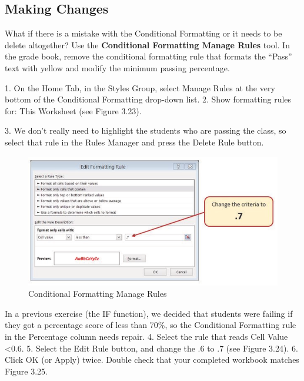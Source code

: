 \subsection{Making Changes}
What if there is a mistake with the Conditional Formatting or it needs to be delete altogether? Use the \textbf{Conditional Formatting Manage Rules} tool. In the grade book, remove the conditional formatting rule that formats the ``Pass'' text with yellow and modify the minimum passing percentage.

1. On the Home Tab, in the Styles Group, select Manage Rules at the very bottom of the
Conditional Formatting drop-down list.
2. Show formatting rules for: This Worksheet (see Figure 3.23).


3. We don’t really need to highlight the students who are passing the class, so select that rule in the
Rules Manager and press the Delete Rule button.


\begin{figure}[H]
	\centering
	\includegraphics[width=\maxwidth{.95\linewidth}]{gfx/ch03_fig23}
	\caption{Conditional Formatting Manage Rules}
	\label{03:fig23}
\end{figure}



In a previous exercise (the IF function), we decided that students were failing if they got a
percentage score of less than 70\%, so the Conditional Formatting rule in the Percentage column
needs repair.
4. Select the rule that reads Cell Value <0.6.
5. Select the Edit Rule button, and change the .6 to .7 (see Figure 3.24).
6. Click OK (or Apply) twice. Double check that your completed workbook matches Figure 3.25.


